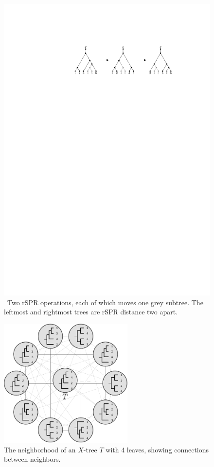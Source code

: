 \documentclass[11pt,onecolumn,conference]{IEEEtran}
\let\MYoriglatexcaption\caption
\renewcommand{\caption}[2][\relax]{\MYoriglatexcaption[#2]{#2}}
\begin{document}
\begin{figure}
	\includegraphics[scale=1.25]{figs/two-spr}
	\caption{\
    Two rSPR operations, each of which moves one grey subtree.
    The leftmost and rightmost trees are rSPR distance two apart.}
	\label{fig:two-spr}
\end{figure}

\begin{figure}
	\includegraphics[width=0.6\textwidth]{figs/neighborhood}
	\hspace*{\stretch{1}}
	\caption{The neighborhood of an $X$-tree $T$ with 4 leaves, showing connections between neighbors.}
	\label{fig:neighborhood}
\end{figure}
\end{document}
